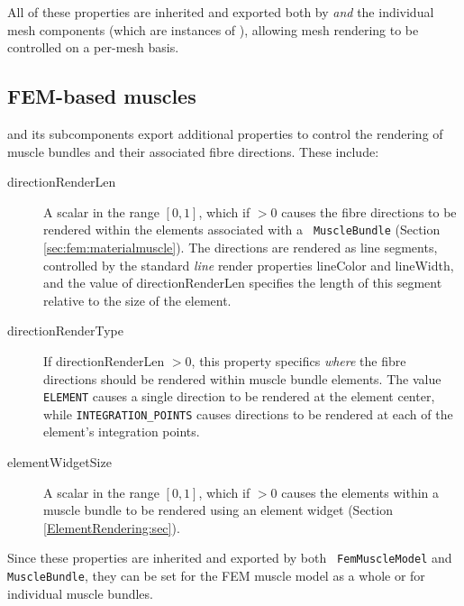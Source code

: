 All of these properties are inherited and exported both by
 {\it and} the individual mesh components (which are
instances of ), allowing mesh rendering
to be controlled on a per-mesh basis.



\subsection{FEM-based muscles}

 and its subcomponents
 export additional
properties to control the rendering of muscle bundles and their
associated fibre directions. These include:

\begin{description}

\item[directionRenderLen]\mbox{}

A scalar in the range $[0,1]$, which if $> 0$ causes the fibre
directions to be rendered within the elements associated with a {\tt
MuscleBundle} (Section \ref{sec:fem:materialmuscle}). The directions
are rendered as line segments, controlled by the standard {\it line}
render properties {\sf lineColor} and {\sf lineWidth}, and the value
of {\sf directionRenderLen} specifies the length of this segment
relative to the size of the element.

\item[directionRenderType]\mbox{}

If {\sf directionRenderLen} $> 0$, this property specifics {\it
where} the fibre directions should be rendered within muscle bundle
elements. The value {\tt ELEMENT} causes a single direction to be
rendered at the element center, while {\tt INTEGRATION\_POINTS} causes
directions to be rendered at each of the element's integration points.

\item[elementWidgetSize]\mbox{}

A scalar in the range $[0,1]$, which if $> 0$ causes the elements
within a muscle bundle to be rendered using an element widget (Section
\ref{ElementRendering:sec}).

\end{description}

Since these properties are inherited and exported by both {\tt
FemMuscleModel} and {\tt MuscleBundle}, they can be set for the FEM
muscle model as a whole or for individual muscle bundles.

